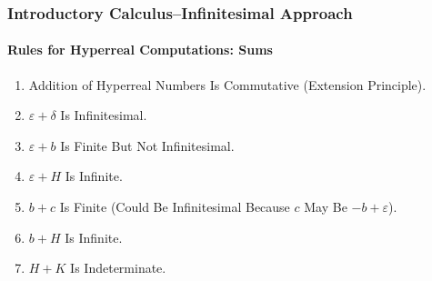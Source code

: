 \begin{frame}
\frametitle{Introductory Calculus--Infinitesimal Approach}
\framesubtitle{Rules for Hyperreal Computations: Sums}
\label{slide:1.5-18}
\begin{hyperrule}[Sums]
\begin{enumerate}
\item Addition of Hyperreal Numbers Is Commutative (Extension Principle).
\item $\varepsilon+\delta$ Is Infinitesimal.
\item $\varepsilon+b$ Is Finite But Not Infinitesimal.
\item $\varepsilon+H$ Is Infinite.
\item $b+c$ Is Finite (Could Be Infinitesimal Because $c$ May Be $-b+\varepsilon$).
\item $b+H$ Is Infinite.
\item \alert{$H+K$ Is Indeterminate}.
\end{enumerate}
\end{hyperrule}
\end{frame}
